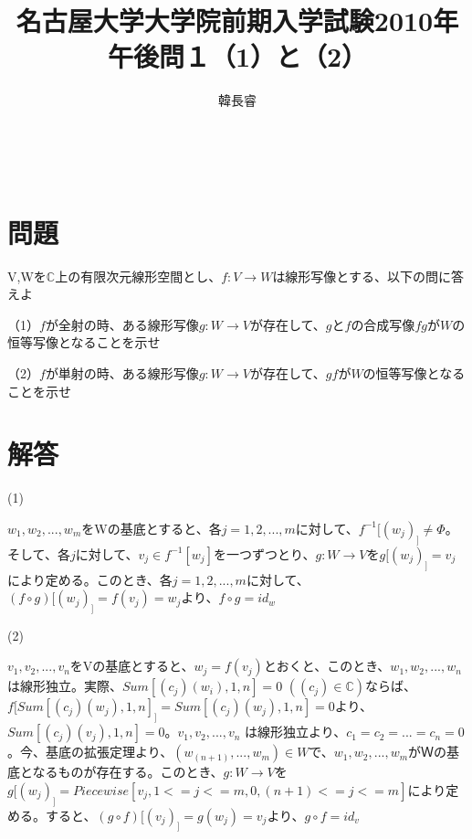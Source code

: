 \documentclass[a4,14pt,titlepage]{jarticle}
\theoremstyle{definition}
\begin{document}
  \title{名古屋大学大学院前期入学試験2010年午後問１（1）と（2）}
　\author{韓長睿}
  \date{}
  \maketitle
  
  \section{問題}
    V,Wを$\mathbb{C}$上の有限次元線形空間とし、$f:V\rightarrow W$は線形写像とする、以下の問に答えよ
    \par
    （1）$f$が全射の時、ある線形写像$g:W\rightarrow V$が存在して、$g$と$f$の合成写像$fg$が$W$の恒等写像となることを示せ
    \par
    （2）$f$が単射の時、ある線形写像$g:W\rightarrow V$が存在して、$gf$が$W$の恒等写像となることを示せ
  
  \section{解答}
    (1)
    \par
    ${w_1,w_2,...,w_m}$をWの基底とすると、各$j=1,2,...,m$に対して、$f^{-1}[(w_j)_]\ne \Phi$。そして、各$j$に対して、$v_j \in f^{-1}[w_j]$を一つずつとり、$g:W\rightarrow V$を$g[(w_j)_]=v_j$により定める。このとき、各$j=1,2,...,m$に対して、$(f\circ g)[(w_j)_]=f(v_j)=w_j$より、$f\circ g=id_w$ 

    \par
    (2)
    \par
  ${v_1,v_2,...,v_n}$をVの基底とすると、$w_j=f(v_j)$とおくと、このとき、${w_1,w_2,...,w_n}$は線形独立。実際、$Sum[(c_j)(w_i),{1,n}]=0$ $((c_j)\in \mathbb{C})$ならば、$f[Sum[(c_j)(w_j),{1,n}]_]=Sum[(c_j)(w_j),{1,n}]=0$より、$Sum[(c_j)(v_j),{1,n}]=0$。${v_1,v_2,...,v_n}$ は線形独立より、$c_1=c_2=...=c_n=0$。今、基底の拡張定理より、$(w_(n+1),...,w_m)\in W$で、${w_1,w_2,...,w_m}$がＷの基底となるものが存在する。このとき、$g:W\rightarrow V$を$g[(w_j)_]=Piecewise[{v_j,1<=j<=m},{0,(n+1)<=j<=m}]$により定める。すると、$(g\circ f)[(v_j)_]=g(w_j)=v_j$より、$g\circ f=id_v$
  
\end{document}
